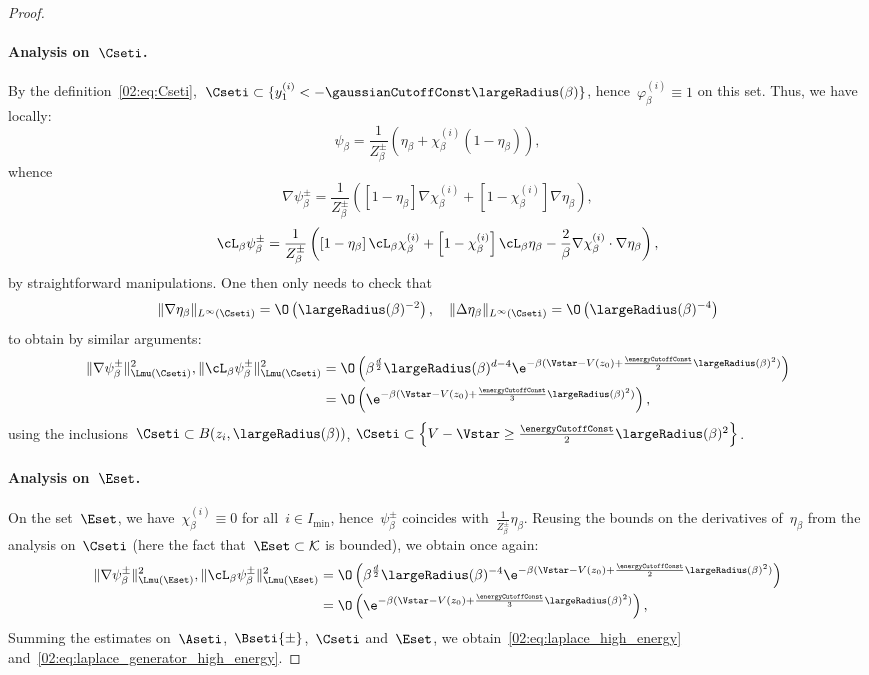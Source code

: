 \begin{proof}
            \paragraph{Analysis on~$\Cseti$.\newline}
            By the definition~\eqref{02:eq:Cseti},~$\Cseti \subset \{ y_1^{(i)} < -\gaussianCutoffConst\largeRadius(\beta)\}$, hence~$\varphi_\beta^{(i)}\equiv 1$ on this set. Thus, we have locally:
            \[\psi_\beta = \frac1{Z_\beta^{\pm}}\left(\eta_\beta + \chi_\beta^{(i)}(1-\eta_\beta)\right),\]
            whence
            \[\nabla\psi^\pm_\beta = \frac1{Z_\beta^{\pm}}\left(\left[1-\eta_\beta\right]\nabla \chi_\beta^{(i)}+\left[1-\chi_\beta^{(i)}\right]\nabla\eta_\beta\right),\]
            \[\cL_\beta\psi_\beta^\pm = \frac1{Z_\beta^{\pm}}\left(\left[1-\eta_\beta\right]\cL_\beta \chi_\beta^{(i)}+\left[1-\chi_\beta^{(i)}\right]\cL_\beta\eta_\beta - \frac2\beta \nabla \chi_\beta^{(i)}\cdot\nabla\eta_\beta\right),\]
            by straightforward manipulations. One then only needs to check that
            \[\|\nabla \eta_\beta\|_{L^\infty(\Cseti)} = \O\left(\largeRadius(\beta)^{-2}\right),\quad \|\Delta \eta_\beta\|_{L^\infty(\Cseti)} = \O\left(\largeRadius(\beta)^{-4}\right)\]
            to obtain by similar arguments:
            \[\begin{split}\|\nabla\psi_\beta^\pm\|^2_{\Lmu(\Cseti)},\|\cL_\beta\psi_\beta^\pm\|^2_{\Lmu(\Cseti)} &= \O\left(\beta^{\frac d2}\largeRadius(\beta)^{d-4}\e^{-\beta(\Vstar-V(z_0)+\frac\energyCutoffConst2\largeRadius(\beta)^2)}\right)\\
                &=\O\left(\e^{-\beta(\Vstar-V(z_0)+\frac\energyCutoffConst3\largeRadius(\beta)^2)}\right),\end{split}\]
            using the inclusions~$\Cseti\subset B(z_i,\largeRadius(\beta))$, $\Cseti \subset \left\{V-\Vstar \geq \frac\energyCutoffConst2 \largeRadius(\beta)^2\right\}$.
            \paragraph{Analysis on~$\Eset$.\newline}
            On the set~$\Eset$, we have~$\chi_\beta^{(i)}\equiv 0$ for all~$i\in I_{\min}$, hence~$\psi_\beta^\pm$ coincides with~$\frac1{Z_\beta^{\pm}}\eta_\beta$. Reusing the bounds on the derivatives of~$\eta_\beta$ from the analysis on~$\Cseti$ (here the fact that~$\Eset\subset\mathcal K$ is bounded), we obtain once again:
            \[\begin{split}\|\nabla\psi_\beta^\pm\|^2_{\Lmu(\Eset)},\|\cL_\beta\psi_\beta^\pm\|^2_{\Lmu(\Eset)} &= \O\left(\beta^{\frac d2}\largeRadius(\beta)^{-4}\e^{-\beta(\Vstar-V(z_0)+\frac\energyCutoffConst2\largeRadius(\beta)^2)}\right)\\
                &=\O\left(\e^{-\beta(\Vstar-V(z_0)+\frac\energyCutoffConst3\largeRadius(\beta)^2)}\right),
            \end{split}\]
            Summing the estimates on~$\Aseti$,~$\Bseti{\pm}$,~$\Cseti$ and~$\Eset$, we obtain~\eqref{02:eq:laplace_high_energy} and~\eqref{02:eq:laplace_generator_high_energy}.            

\end{proof}

